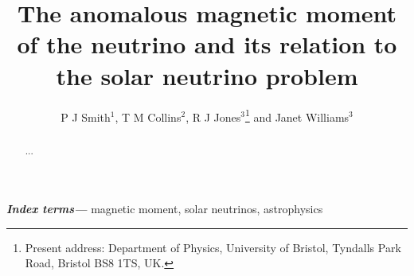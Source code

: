 \documentclass[12pt]{iopart}
\providecommand{\keywords}[1]{\textbf{\textit{Index terms---}} #1}
\begin{document}
\title[The anomalous magnetic moment of the neutrino]{The anomalous magnetic moment of the neutrino and its relation to the solar neutrino problem}

\author{P J Smith$^1$, T M Collins$^2$, R J Jones$^3$\footnote{Present address: Department of Physics, University of Bristol, Tyndalls Park Road, Bristol BS8 1TS, UK.} and Janet Williams$^3$}

\address{$^1$ Mathematics Faculty, Open University, Milton Keynes MK7~6AA, UK}
\address{$^2$ Department of Mathematics, Imperial College, Prince Consort Road, London SW7~2BZ, UK}
\address{$^3$ Department of Computer Science, University College London, Gower Street, London WC1E~6BT, UK}

\begin{abstract}
...
\end{abstract}

\keywords{magnetic moment, solar neutrinos, astrophysics}
\submitto{\jpg}
\maketitle
\end{document}
